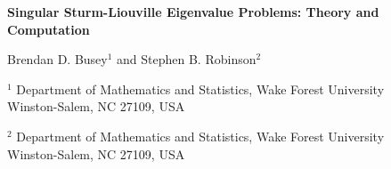 \documentclass[executivepaper]{article}
\begin{document}
\renewcommand\thesubsection{\thesection.\arabic{subsection}}

\renewcommand{\ttdefault}{cmtt}

\newtheorem{observation}{Observation}

\vspace*{-25mm}

\begin{center}
	
{\LARGE \textbf{Singular Sturm-Liouville Eigenvalue Problems: Theory and Computation}}

\vspace{3mm}

Brendan D. Busey$^1$ and Stephen B. Robinson$^2$\\ 

\vspace{2mm}

$^1$ Department of Mathematics and Statistics, Wake Forest University\\
Winston-Salem, NC 27109, USA\\

\vspace{2mm}

$^2$ Department of Mathematics and Statistics, Wake Forest University\\
Winston-Salem, NC 27109, USA

\end{center}
	
\vspace{5mm}
\end{document}
